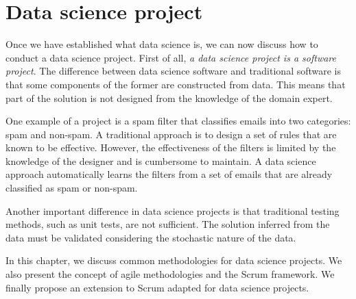 \chapter{Data science project}
\label{chap:project}
\glsresetall



Once we have established what data science is, we can now discuss how to conduct a data science
project.
First of all, \emph{a data science project is a software project}.  The difference between data science
software and traditional software is that some components of the former are
constructed from data.  This means that part of the solution is not designed from the
knowledge of the domain expert.

One example of a project is a spam filter that
classifies emails into two categories: spam and non-spam.  A traditional approach is
to design a set of rules that are known to be effective.  However, the effectiveness of
the filters is limited by the knowledge of the designer and is cumbersome to maintain.  A
data science approach automatically learns the filters from a set of
emails that are already classified as spam or non-spam.

Another important difference in data science projects is that traditional testing methods,
such as unit tests, are not sufficient. The solution inferred from the data must be validated
considering the stochastic nature of the data.

In this chapter, we discuss common methodologies for data science projects.  We also
present the concept of agile methodologies and the Scrum framework.  We finally propose an
extension to Scrum adapted for data science projects.

